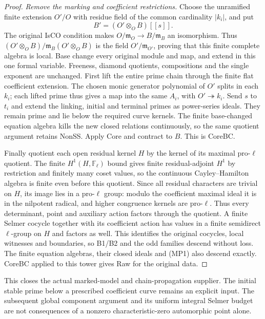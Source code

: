 \begin{proof}
\emph{Remove the marking and coefficient restrictions.}
Choose the unramified finite extension $O'/O$ with residue field of
the common cardinality $|k_i|$, and put
\[
                         B'=(O'\otimes_OB)[[s]].             \tag{MP12}
\]
The original IsCO condition makes $O/\mathfrak m_O\to B/\mathfrak m_B$
an isomorphism.  Thus $(O'\otimes_OB)/\mathfrak m_B(O'\otimes_OB)$
is the field $O'/\mathfrak m_{O'}$, proving that this finite complete
algebra is local.  Base change every original module and map, and
extend in this one formal variable.  Freeness, diamond quotients, compositions and the
single exponent are unchanged.  First lift the entire prime chain
through the finite flat coefficient extension.  The chosen monic
generator polynomial of $O'$ splits in each $k_i$; each lifted prime
thus gives a map into the same $A_i$, with $O'\twoheadrightarrow k_i$.
Send $s$ to $t_i$ and extend the linking, initial and terminal primes
as power-series ideals.  They remain prime and lie below the required
curve kernels.  The finite base-changed equation algebra kills the
new closed relations continuously, so the same quotient argument
retains NonSS.  Apply Core and contract to $B$.  This is CoreBC.

Finally quotient each open residual kernel $H$ by the kernel of its
maximal pro-$\ell$ quotient.  The finite $H^1(H,\mathbb F_\ell)$
bound gives finite residual-adjoint $H^1$ by restriction and finitely
many coset values, so the continuous Cayley--Hamilton algebra is
finite even before this quotient.  Since all residual characters
are trivial on $H$, its image lies in a pro-$\ell$ group: modulo
the coefficient maximal ideal it is in the nilpotent radical, and
higher congruence kernels are pro-$\ell$.  Thus every determinant,
point and auxiliary action factors through the quotient.  A finite
Selmer cocycle together with its coefficient action has values in
a finite semidirect $\ell$-group on $H$ and factors as well.  This
identifies the original cocycles, local witnesses and boundaries,
so B1/B2 and the odd families descend without loss.  The finite
equation algebras, their closed ideals and (MP1) also descend exactly.
CoreBC applied to this tower gives Raw for the original data.
\end{proof}

This closes the actual marked-model and chain-propagation supplier.
The initial stable prime below a prescribed coefficient curve remains
an explicit input.  The subsequent global component argument and
its uniform integral Selmer budget are not consequences of a nonzero
characteristic-zero automorphic point alone.
